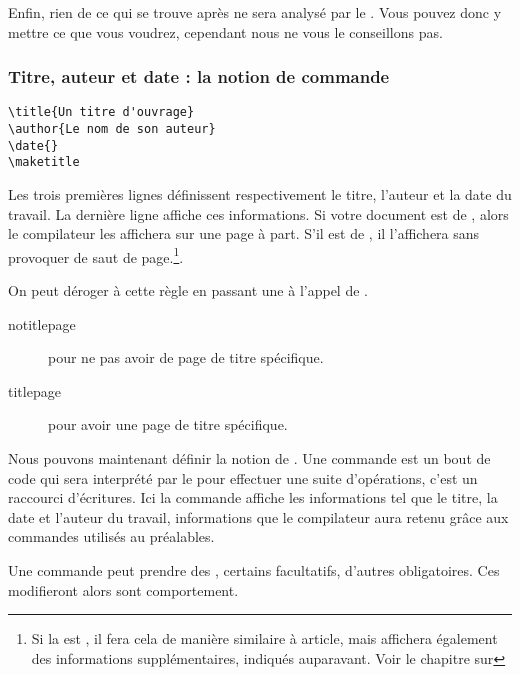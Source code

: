 Enfin, rien de ce qui se trouve après \verb|| ne sera analysé par le . Vous pouvez donc y mettre ce que vous voudrez, cependant nous ne vous le conseillons pas.

\subsubsection{Titre, auteur et date : la notion de commande}

\begin{verbatim}
\title{Un titre d'ouvrage}
\author{Le nom de son auteur}
\date{}
\maketitle
\end{verbatim}

Les trois premières lignes définissent respectivement le titre, l'auteur et la date du travail.  
La dernière ligne affiche ces informations. Si votre document est de  , alors le compilateur les affichera sur une page à part. S'il est de  , il l'affichera sans provoquer de saut de page.\footnote{Si la  est , il fera cela de manière similaire à article, mais affichera également des informations supplémentaires, indiqués auparavant. Voir le chapitre sur }.

On peut déroger à cette règle en passant une  à l'appel de .
\begin{description}
\item[notitlepage] pour ne pas avoir de page de titre spécifique.
\item[titlepage] pour avoir une page de titre spécifique.
\end{description}

Nous pouvons maintenant définir la notion de . Une commande est un bout de code qui sera interprété par le  pour effectuer une suite d'opérations, c'est un raccourci d'écritures. 
Ici la commande  affiche les informations tel que le titre, la date et l'auteur du travail, informations que le compilateur aura retenu grâce aux commandes utilisés au préalables.

Une commande peut prendre des , certains facultatifs, d'autres obligatoires. Ces  modifieront alors sont comportement.

